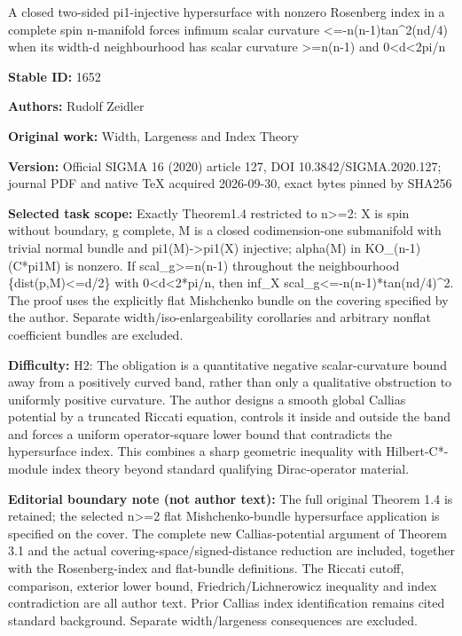 \documentclass[11pt]{article}
\numberwithin{equation}{section}
\begin{document}
\begin{center}\Large A closed two-sided pi1-injective hypersurface with nonzero Rosenberg index in a complete spin n-manifold forces infimum scalar curvature <=-n(n-1)tan\textasciicircum{}2(nd/4) when its width-d neighbourhood has scalar curvature >=n(n-1) and 0<d<2pi/n\end{center}
\noindent\textbf{Stable ID:} 1652\par
\noindent\textbf{Authors:} Rudolf Zeidler\par
\noindent\textbf{Original work:} Width, Largeness and Index Theory\par
\noindent\textbf{Version:} Official SIGMA 16 (2020) article 127, DOI 10.3842/SIGMA.2020.127; journal PDF and native TeX acquired 2026-09-30, exact bytes pinned by SHA256\par
\noindent\textbf{Selected task scope:} Exactly Theorem1.4 restricted to n>=2: X is spin without boundary, g complete, M is a closed codimension-one submanifold with trivial normal bundle and pi1(M)->pi1(X) injective; alpha(M) in KO\_(n-1)(C*pi1M) is nonzero. If scal\_g>=n(n-1) throughout the neighbourhood \{dist(p,M)<=d/2\} with 0<d<2*pi/n, then inf\_X scal\_g<=-n(n-1)*tan(nd/4)\textasciicircum{}2. The proof uses the explicitly flat Mishchenko bundle on the covering specified by the author. Separate width/iso-enlargeability corollaries and arbitrary nonflat coefficient bundles are excluded.\par
\noindent\textbf{Difficulty:} H2: The obligation is a quantitative negative scalar-curvature bound away from a positively curved band, rather than only a qualitative obstruction to uniformly positive curvature. The author designs a smooth global Callias potential by a truncated Riccati equation, controls it inside and outside the band and forces a uniform operator-square lower bound that contradicts the hypersurface index. This combines a sharp geometric inequality with Hilbert-C*-module index theory beyond standard qualifying Dirac-operator material.\par
\noindent\textbf{Editorial boundary note (not author text):} The full original Theorem 1.4 is retained; the selected n>=2 flat Mishchenko-bundle hypersurface application is specified on the cover. The complete new Callias-potential argument of Theorem 3.1 and the actual covering-space/signed-distance reduction are included, together with the Rosenberg-index and flat-bundle definitions. The Riccati cutoff, comparison, exterior lower bound, Friedrich/Lichnerowicz inequality and index contradiction are all author text. Prior Callias index identification remains cited standard background. Separate width/largeness consequences are excluded.\par
\end{document}
